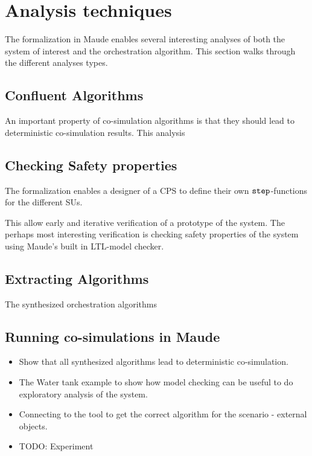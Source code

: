 \section{Analysis techniques}\label{sc:casestudy}

The formalization in Maude enables several interesting analyses of both the system of interest and the orchestration algorithm. 
This section walks through the different analyses types.

\subsection{Confluent Algorithms}
An important property of co-simulation algorithms is that they should lead to deterministic co-simulation results. 
This analysis 

\subsection{Checking Safety properties}
The formalization enables a designer of a CPS to define their own $\mathtt{step}_{}$-functions for the different SUs.  

This allow early and iterative verification of a prototype of the system. 
The perhaps most interesting verification is checking safety properties of the system using Maude's built in LTL-model checker. 


\subsection{Extracting Algorithms}
The synthesized orchestration algorithms 

\subsection{Running co-simulations in Maude}

\begin{itemize}
  \item Show that all synthesized algorithms lead to deterministic co-simulation.
  \item The Water tank example to show how model checking can be useful to do exploratory analysis of the system.
  \item Connecting to the tool to get the correct algorithm for the scenario - external objects.
  \item TODO: Experiment
\end{itemize}

